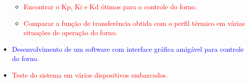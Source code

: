 \begin{itemize}
\begin{itemize}
        \item \textcolor{red}{Encontrar o Kp, Ki e Kd ótimos para o controle do forno.}
        
        \item \textcolor{red}{Comparar a função de transferência obtida com o perfil térmico em várias situações de operação do forno.}
    
    \end{itemize}

    \item \textcolor{blue}{Desenvolvimento de um software com interface gráfica amigável para controle do forno.}
    
    \item \textcolor{red}{Teste do sistema em vários dispositivos embarcados.}
 
\end{itemize}



